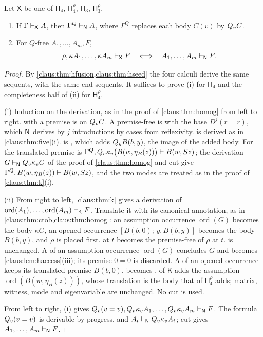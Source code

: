 \begin{theorem}
\label{claus:thm:h3}
Let $\mathsf{X}$ be one of $\mathsf{H}_4$, $\mathsf{H}_4^{\rho}$,
$\mathsf{H}_3$, $\mathsf{H}_3^{\rho}$.
\begin{enumerate}[label=(\roman*)]
\item If $\Gamma\vdash_{\mathsf{X}}A$, then $\Gamma^{Q}\vdash_{\mathsf{N}}A$,
where $\Gamma^{Q}$ replaces each body $C(v)$ by $Q_{v}C$.
\item For $Q$-free $A_1,\dots,A_m,F$,
\[
 \rho,\kappa A_1,\dots,\kappa A_m\vdash_{\mathsf{X}}F
 \quad\Longleftrightarrow\quad
 A_1,\dots,A_m\vdash_{\mathsf{N}}F .
\]
\end{enumerate}
\end{theorem}
\begin{proof}
By \cref{claus:thm:hfusion,claus:thm:hseed} the four calculi derive the
same sequents, with the same end sequents. It suffices to prove (i) for
$\mathsf{H}_4$ and the completeness half of (ii) for
$\mathsf{H}_4^{\rho}$.

(i) Induction on the derivation, as in the proof of
\cref{claus:thm:homog} from left to right.  with a premise is
 on $Q_{v}C$. A premise-free  is 
with the base $D^j(r=r)$, which $\mathsf{N}$ derives by $j$ introductions by cases
from reflexivity.  is derived as in
\cref{claus:thm:five}(i).  is , which adds
$Q_{y}B(b,y)$, the image of the added body. For  the
translated premise is
$\Gamma^{Q},Q_{v}\kappa_v\bigl(B(w,\eta_B(z))\bigr)\vdash B(w,S z)$;
the derivation $G\vdash_{\mathsf{N}}Q_{v}\kappa_vG$ of the proof of
\cref{claus:thm:homog} and cut give
$\Gamma^{Q},B(w,\eta_B(z))\vdash B(w,S z)$, and the two modes are
treated as in the proof of \cref{claus:thm:k}(i).

(ii) From right to left, \cref{claus:thm:k} gives a derivation of
$\operatorname{ord}(A_1),\dots,\operatorname{ord}(A_m)\vdash_{\mathsf{K}}F$.
Translate it with its canonical annotation, as in
\cref{claus:thm:ctob,claus:thm:homog}: an assumption occurrence
$\operatorname{ord}(G)$ becomes the body $\kappa G$, an opened occurrence
$[B(b,0);\,y.\,B(b,y)]$ becomes the body $B(b,y)$, and $\rho$ is placed
first.  at $t$ becomes the premise-free  of
$\rho$ at $t$.  is unchanged. A  of an
assumption occurrence $\operatorname{ord}(G)$ concludes $G$ and becomes
\cref{claus:lem:haccess}(iii); its premise $0=0$ is discarded. A
 of an opened occurrence keeps its translated premise
$B(b,0)$.  becomes .  of
$\mathsf{K}$ adds the assumption $\operatorname{ord}(B(w,\eta_B(z)))$,
whose translation is the body that  of
$\mathsf{H}_4^{\rho}$ adds; matrix, witness, mode and eigenvariable are
unchanged. No cut is used.

From left to right, (i) gives
$Q_{v}(v=v),Q_{v}\kappa_vA_1,\dots,Q_{v}\kappa_vA_m\vdash_{\mathsf{N}}F$. The
formula $Q_{v}(v=v)$ is derivable by progress, and
$A_i\vdash_{\mathsf{N}}Q_{v}\kappa_vA_i$; cut gives
$A_1,\dots,A_m\vdash_{\mathsf{N}}F$.
\end{proof}

